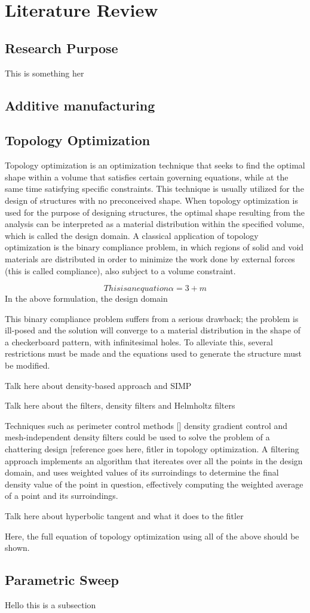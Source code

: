 \documentclass[../main.tex]{subfiles}
\begin{document}
\section{Literature Review}

\subsection{Research Purpose}
 
This is something her

\subsection{Additive manufacturing}

\subsection{Topology Optimization}

Topology optimization is an optimization technique that seeks to find the optimal shape within a volume that satisfies certain governing equations, while at the same time satisfying specific constraints. This technique is usually utilized for the design of structures with no preconceived shape. When topology optimization is used for the purpose of designing structures, the optimal shape resulting from the analysis can be interpreted as a material distribution within the specified volume, which is called the design domain. A classical application of topology optimization is the binary compliance problem, in which regions of solid and void materials are distributed in order to minimize the work done by external forces (this is called compliance), also subject to a volume constraint. 

$$ This is an equation \alpha = 3 + m $$
In the above formulation, the design domain 

This binary compliance problem suffers from a serious drawback; the problem is ill-posed and the solution will converge to a material distribution in the shape of a checkerboard pattern, with infinitesimal holes. To alleviate this, several restrictions must be made  and the equations used to generate the structure must be modified. 

Talk here about density-based approach and SIMP 

Talk here about the filters, density filters and Helmholtz filters

Techniques such as perimeter control methods [] density gradient control 
and mesh-independent density filters could be used to solve the problem of a chattering design [reference goes here, fitler in topology optimization. A filtering approach implements an algorithm that itereates over all the points in the design domain, and uses weighted values of its surroindings to determine the final density value of the point in question, effectively computing the weighted average of a point and its surroindings.

Talk here about hyperbolic tangent and what it does to the fitler

Here, the full equation of topology optimization using all of the above should be shown.

\subsection{Parametric Sweep}

Hello this is a subsection
\end{document}
